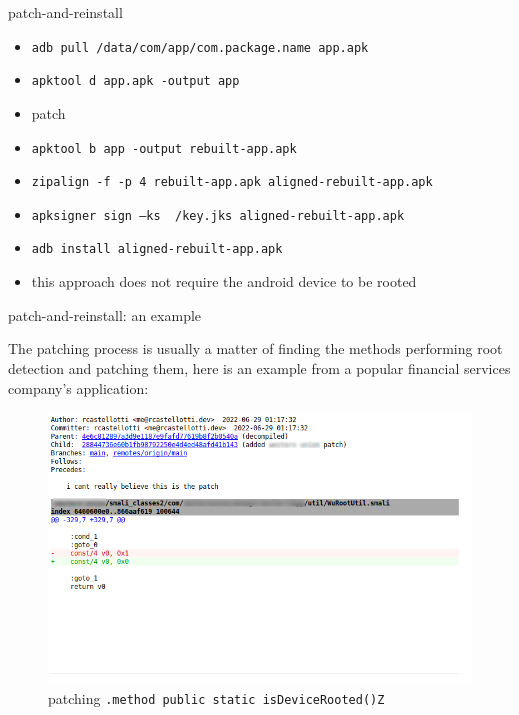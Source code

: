 \documentclass{beamer}
\begin{document}
\begin{frame}{patch-and-reinstall}

    \begin{itemize}
        \item {\footnotesize \texttt{adb pull /data/com/app/com.package.name app.apk}}
        \item {\footnotesize \texttt{apktool d app.apk -output app}}
        \item patch
        \item {\footnotesize \texttt{apktool b app -output rebuilt-app.apk}}
        \item {\footnotesize \texttt{zipalign -f -p 4 rebuilt-app.apk  aligned-rebuilt-app.apk}}
        \item {\footnotesize \texttt{apksigner sign --ks ~/key.jks  aligned-rebuilt-app.apk}}
        \item {\footnotesize \texttt{adb install aligned-rebuilt-app.apk}}
        \item this approach does not require the android device to be rooted 
    \end{itemize}

\end{frame}

\begin{frame}[fragile]{patch-and-reinstall: an example}

   The patching process is usually a matter of finding the methods performing root detection and patching them, here is an example from a popular financial services company's application:

    \begin{figure}
        \centering \includegraphics[scale=1.4]{patch.png}
        \caption{patching \texttt{.method public static isDeviceRooted()Z} }
    \end{figure}

\end{frame}
\end{document}

